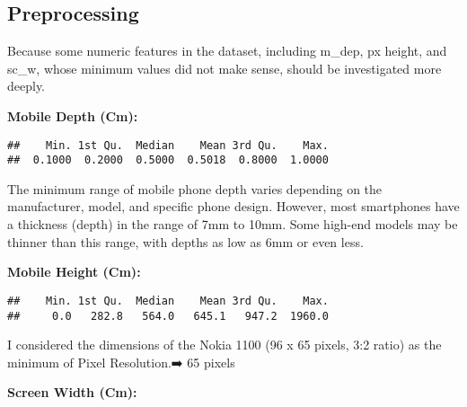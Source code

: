 \documentclass[
]{article}
\newenvironment{Shaded}{\begin{snugshade}}{\end{snugshade}}
\newcommand{\CommentTok}[1]{\textcolor[rgb]{0.56,0.35,0.01}{\textit{#1}}}
\newcommand{\FunctionTok}[1]{\textcolor[rgb]{0.13,0.29,0.53}{\textbf{#1}}}
\newcommand{\NormalTok}[1]{#1}
\newcommand{\SpecialCharTok}[1]{\textcolor[rgb]{0.81,0.36,0.00}{\textbf{#1}}}
\begin{document}
\subsection{Preprocessing}\label{preprocessing}

Because some numeric features in the dataset, including m\_dep, px
height, and sc\_w, whose minimum values did not make sense, should be
investigated more deeply.

\textbf{Mobile Depth (Cm):}

\begin{Shaded}
\end{Shaded}

\begin{verbatim}
##    Min. 1st Qu.  Median    Mean 3rd Qu.    Max. 
##  0.1000  0.2000  0.5000  0.5018  0.8000  1.0000
\end{verbatim}

The minimum range of mobile phone depth varies depending on the
manufacturer, model, and specific phone design. However, most
smartphones have a thickness (depth) in the range of 7mm to 10mm. Some
high-end models may be thinner than this range, with depths as low as
6mm or even less.

\textbf{Mobile Height (Cm):}

\begin{Shaded}
\end{Shaded}

\begin{verbatim}
##    Min. 1st Qu.  Median    Mean 3rd Qu.    Max. 
##     0.0   282.8   564.0   645.1   947.2  1960.0
\end{verbatim}

I considered the dimensions of the Nokia 1100 (96 x 65 pixels, 3:2
ratio) as the minimum of Pixel Resolution.➡️ 65 pixels

\textbf{Screen Width (Cm):}

\begin{Shaded}
\end{Shaded}
\end{document}
